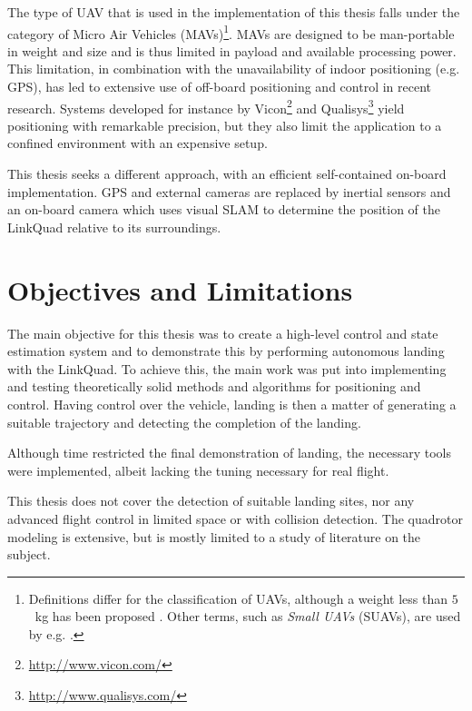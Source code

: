     The type of UAV that is used in the implementation of this thesis
    falls under the category of Micro Air Vehicles (MAVs)\footnote{Definitions differ for the classification of UAVs,
    although a weight less than $5$~kg has been proposed \citep{arjomandi:classification}.
    Other terms, such as \textit{Small UAVs} (SUAVs), are used by e.g. \citep{valavanis2007advances}.}.
    MAVs are designed to be man-portable in weight and size and is thus
    limited in payload and available processing power.
    This limitation, in combination with the unavailability of indoor positioning (e.g. GPS),
    has led to extensive use of off-board positioning and control in recent research.
    Systems developed for instance by Vicon\footnote{\url{http://www.vicon.com/}} and
    Qualisys\footnote{\url{http://www.qualisys.com/}} yield positioning with
    remarkable precision, but they also limit the application to a confined
    environment with an expensive setup.

    This thesis seeks a different approach, with an efficient self-contained
    on-board implementation. GPS and external cameras are replaced by inertial sensors and an
    on-board camera which uses visual SLAM to determine the position of the LinkQuad relative to
    its surroundings.








\section{Objectives and Limitations}
    The main objective for this thesis was to create a high-level control and state estimation
    system and to demonstrate this by performing autonomous landing with the LinkQuad.
    To achieve this, the main work was put into implementing and testing theoretically solid
    methods and algorithms for positioning and control.
    Having control over the vehicle, landing is then a matter of generating
    a suitable trajectory and detecting the completion of the landing.

    Although time restricted the final demonstration of landing, the necessary tools
    were implemented, albeit lacking the tuning necessary for real flight.

    This thesis does not cover the detection of suitable landing sites,
    nor any advanced flight control in limited space or with collision detection.
    The quadrotor modeling is extensive, but is mostly limited to a study
    of literature on the subject.

